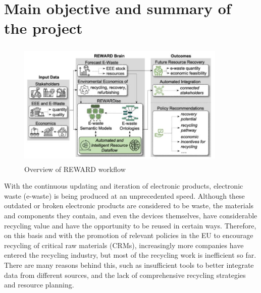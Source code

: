 \documentclass{article}
\numberwithin{equation}{section}
\begin{document}
\section{Main objective and summary of the project}
\begin{figure}[h]
\centering
\includegraphics[height=6cm,width=10cm]{overview.png}
\caption{Overview of REWARD workflow} \label{fig:overview}
\end{figure}
With the continuous updating and iteration of electronic products, electronic waste (e-waste) is being produced at an unprecedented speed. Although these outdated or broken electronic products are considered to be waste, the materials and components they contain, and even the devices themselves, have considerable recycling value and have the opportunity to be reused in certain ways. Therefore, on this basis and with the promotion of relevant policies in the EU to encourage recycling of critical raw materials (CRMs), increasingly more companies have entered the recycling industry, but most of the recycling work is inefficient so far. There are many reasons behind this, such as insufficient tools to better integrate data from different sources, and the lack of comprehensive recycling strategies and resource planning.
\end{document}
